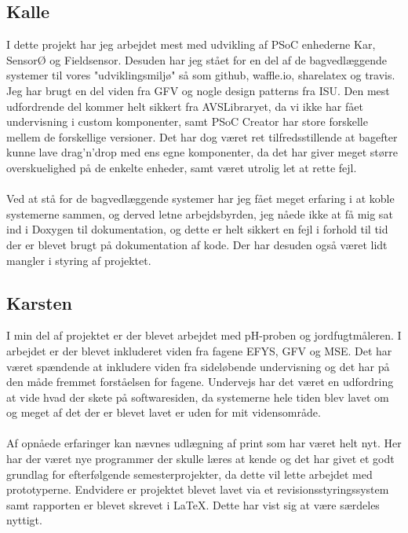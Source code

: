 \subsection{Kalle}
I dette projekt har jeg arbejdet mest med udvikling af PSoC enhederne Kar, SensorØ og Fieldsensor. Desuden har jeg  stået for en del af de bagvedlæggende systemer til vores "udviklingsmiljø" så som github, waffle.io, sharelatex og travis. Jeg har brugt en del viden fra GFV og nogle design patterns fra ISU. Den mest udfordrende del kommer helt sikkert fra AVSLibraryet, da vi ikke har fået undervisning i custom komponenter, samt PSoC Creator har store forskelle mellem de forskellige versioner. Det har dog været ret tilfredsstillende at bagefter kunne lave drag'n'drop med ens egne komponenter, da det har giver meget større overskuelighed på de enkelte enheder, samt været utrolig let at rette fejl.\\\\
Ved at stå for de bagvedlæggende systemer har jeg fået meget erfaring i at koble systemerne sammen, og derved letne arbejdsbyrden, jeg nåede ikke at få mig sat ind i Doxygen til dokumentation, og dette er helt sikkert en fejl i forhold til tid der er blevet brugt på dokumentation af kode. Der har desuden også været lidt mangler i styring af projektet. 

\subsection{Karsten}
I min del af projektet er der blevet arbejdet med pH-proben og jordfugtmåleren. I arbejdet er der blevet inkluderet viden fra fagene EFYS, GFV og MSE. Det har været spændende at inkludere viden fra sideløbende undervisning og det har på den måde fremmet forståelsen for fagene. Undervejs har det været en udfordring at vide hvad der skete på softwaresiden, da systemerne hele tiden blev lavet om og meget af det der er blevet lavet er uden for mit vidensområde.
\\\\
Af opnåede erfaringer kan nævnes udlægning af print som har været helt nyt. Her har der været nye programmer der skulle læres at kende og det har givet et godt grundlag for efterfølgende semesterprojekter, da dette vil lette arbejdet med prototyperne. Endvidere er projektet blevet lavet via et revisionsstyringssystem samt rapporten er blevet skrevet i LaTeX. Dette har vist sig at være særdeles nyttigt. 

